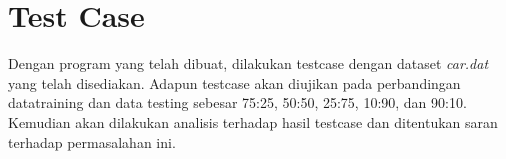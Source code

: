 \documentclass[11pt,a4paper]{report}
\begin{document}
	\section*{Test Case}
	Dengan program yang telah dibuat, dilakukan testcase dengan dataset \emph{car.dat} yang telah disediakan. Adapun testcase akan diujikan pada perbandingan datatraining dan data testing sebesar 75:25, 50:50, 25:75, 10:90, dan 90:10. Kemudian akan dilakukan analisis terhadap hasil testcase dan ditentukan saran terhadap permasalahan ini.
	
	
\end{document}
